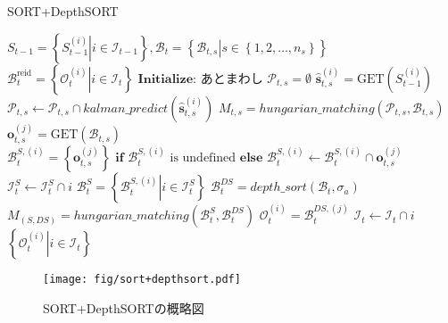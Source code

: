    \begin{algorithm}[t]
        \caption{SORT+DepthSORT}
        \label{alg:SORT+DepthSORT}
        \begin{algorithmic}[1]
            \REQUIRE $S_{t-1} = \left\{\left.S_{t-1}^{(i)}\right| i \in \mathcal{I}_{t-1}\right\}, \mathcal{B}_t = \left\{\left.\mathcal{B}_{t,s} \right| s \in \left\{1, 2, \dots, n_s\right\}\right\}$
            \ENSURE $\mathcal{B}_t^{\text{reid}} = \left\{\left.\mathcal{O}_t^{(i)}\right|i \in \mathcal{I}_t\right\}$
            \STATE $\textbf{Initialize: } \text{あとまわし}$
                \STATE $\mathcal{P}_{t,s} = \emptyset$
                    \STATE $\hat{\bm{s}}_{t,s}^{(i)} = \text{GET}(S_{t-1}^{(i)})$
                    \STATE $\mathcal{P}_{t,s} \leftarrow \mathcal{P}_{t,s} \cap kalman\_predict(\hat{\bm{s}}_{t,s}^{(i)})$
                \ENDFOR
                \STATE $M_{t,s} = hungarian\_matching(\mathcal{P}_{t,s}, \mathcal{B}_{t,s})$
                    \STATE $\bm{o}_{t,s}^{(j)} = \text{GET}(\mathcal{B}_{t,s})$
                    \STATE $\mathcal{B}_t^{S,(i)} = \left\{\bm{o}_{t,s}^{(j)}\right\} \textbf{ if } \mathcal{B}_t^{S,(i)} \text{ is undefined} \textbf{ else } \mathcal{B}_t^{S,(i)} \leftarrow \mathcal{B}_t^{S,(i)} \cap \bm{o}_{t,s}^{(j)}$
                    \STATE $\mathcal{I}_t^{S} \leftarrow \mathcal{I}_t^{S} \cap i$
                \ENDFOR
                \STATE $\mathcal{B}_t^{S} = \left\{\left.\mathcal{B}_t^{S,(i)}\right|i \in \mathcal{I}_t^{S}\right\}$
            \ENDFOR
            \STATE $\mathcal{B}_t^{DS} = depth\_sort(\mathcal{B}_t, \sigma_a)$
            \STATE $M_{(S,DS)} = hungarian\_matching(\mathcal{B}_t^{S}, \mathcal{B}_t^{DS})$
                \STATE $\mathcal{O}_t^{(i)} = \mathcal{B}_t^{DS, (j)}$
                \STATE $\mathcal{I}_t \leftarrow \mathcal{I}_t \cap i$
            \ENDFOR
            \RETURN $\left\{\left.\mathcal{O}_t^{(i)}\right| i \in \mathcal{I}_t\right\}$
        \end{algorithmic}
    \end{algorithm}

    \begin{figure}[t]
        \centering
        \texttt{[image: fig/sort+depthsort.pdf]}
        \caption[SORT+DepthSORTの概略図]{SORT+DepthSORTの概略図}
        \label{fig:sort+depthsort}
    \end{figure}
